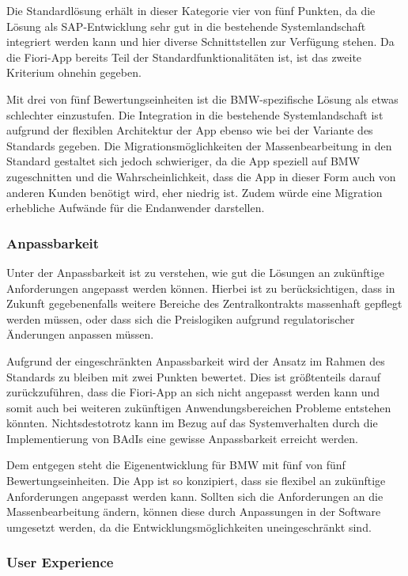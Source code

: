 Die Standardlösung erhält in dieser Kategorie vier von fünf Punkten, da die Lösung als SAP-Entwicklung sehr gut in die bestehende Systemlandschaft integriert werden kann und hier diverse Schnittstellen zur Verfügung stehen. Da die Fiori-App bereits Teil der Standardfunktionalitäten ist, ist das zweite Kriterium ohnehin gegeben.

Mit drei von fünf Bewertungseinheiten ist die BMW-spezifische Lösung als etwas schlechter einzustufen. Die Integration in die bestehende Systemlandschaft ist aufgrund der flexiblen Architektur der App ebenso wie bei der Variante des Standards gegeben. Die Migrationsmöglichkeiten der Massenbearbeitung in den Standard gestaltet sich jedoch schwieriger, da die App speziell auf BMW zugeschnitten und die Wahrscheinlichkeit, dass die App in dieser Form auch von anderen Kunden benötigt wird, eher niedrig ist. Zudem würde eine Migration erhebliche Aufwände für die Endanwender darstellen.

\subsubsection{Anpassbarkeit}

Unter der Anpassbarkeit ist zu verstehen, wie gut die Lösungen an zukünftige Anforderungen angepasst werden können. Hierbei ist zu berücksichtigen, dass in Zukunft gegebenenfalls weitere Bereiche des Zentralkontrakts massenhaft gepflegt werden müssen, oder dass sich die Preislogiken \zB aufgrund regulatorischer Änderungen anpassen müssen.

Aufgrund der eingeschränkten Anpassbarkeit wird der Ansatz im Rahmen des Standards zu bleiben mit zwei Punkten bewertet. Dies ist grö\ss tenteils darauf zurückzuführen, dass die Fiori-App an sich nicht angepasst werden kann und somit auch bei weiteren zukünftigen Anwendungsbereichen Probleme entstehen könnten. Nichtsdestotrotz kann im Bezug auf das Systemverhalten durch die Implementierung von BAdIs eine gewisse Anpassbarkeit erreicht werden.

Dem entgegen steht die Eigenentwicklung für BMW mit fünf von fünf Bewertungseinheiten. Die App ist so konzipiert, dass sie flexibel an zukünftige Anforderungen angepasst werden kann. Sollten sich die Anforderungen an die Massenbearbeitung ändern, können diese durch Anpassungen in der Software umgesetzt werden, da die Entwicklungsmöglichkeiten uneingeschränkt sind. 

\subsubsection{User Experience}

